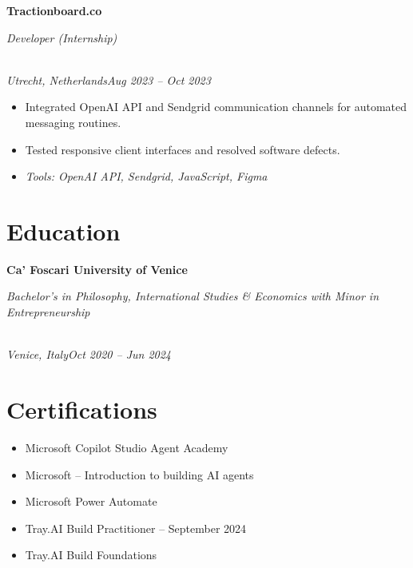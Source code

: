 \documentclass[a4paper,10pt]{article}
\newcommand{\role}[4]{\vspace{3pt}\noindent\hspace{0.6em}\parbox[t]{0.38\textwidth}{\raggedright\textbf{#1}}\hfill\parbox[t]{0.58\textwidth}{\raggedleft\textit{#2}}\\{\textit{#3}\hfill\textit{#4}}\vspace{1pt}}
\begin{document}
\role{Tractionboard.co}{Developer (Internship)}{Utrecht, Netherlands}{Aug 2023 -- Oct 2023}
\begin{itemize}
\item Integrated OpenAI API and Sendgrid communication channels for automated messaging routines.
\item Tested responsive client interfaces and resolved software defects.
\item \textit{Tools: OpenAI API, Sendgrid, JavaScript, Figma}
\end{itemize}

\section{Education}
\role{Ca' Foscari University of Venice}{Bachelor's in Philosophy, International Studies \& Economics with Minor in Entrepreneurship}{Venice, Italy}{Oct 2020 -- Jun 2024}

\section{Certifications}
\begin{itemize}
\item Microsoft Copilot Studio Agent Academy
\item Microsoft -- Introduction to building AI agents
\item Microsoft Power Automate
\item Tray.AI Build Practitioner -- September 2024
\item Tray.AI Build Foundations
\end{itemize}
\end{document}
